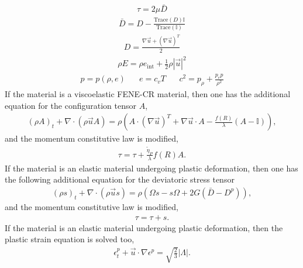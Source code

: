 \documentclass[]{article}
\newcommand{\EyeTen}{\mathbb{I}}
\begin{document}
\begin{eqnarray}
	\tau=2\mu\bar{D}
\end{eqnarray}
\begin{eqnarray}
	\bar{D}=D-\frac{\mbox{Trace}(D)\EyeTen}{\mbox{Trace}(\EyeTen)}
\end{eqnarray}
\begin{eqnarray}
	D=\frac{\nabla\vec{u}+(\nabla\vec{u})^{T}}{2}
\end{eqnarray}
\begin{eqnarray}
	\rho E=\rho e_{\mbox{int}}+
	\frac{1}{2}\rho|\vec{u}|^{2}
\end{eqnarray}
\begin{eqnarray}
p=p(\rho,e) \hspace{20pt} e=c_{v}T \hspace{20pt}
c^{2}=p_{\rho}+\frac{p_{e}p}{\rho^{2}}
\end{eqnarray}
If the material is a viscoelastic FENE-CR material, then one has the
additional equation for the configuration tensor 
$A$\cite{stewart2008improved},
\begin{eqnarray}
	(\rho A)_{t}+\nabla\cdot(\rho\vec{u} A)=
       \rho( A\cdot(\nabla\vec{u})^{T}+
	\nabla\vec{u}\cdot A-\frac{f(R)}{\lambda}(A-\EyeTen)) ,
\end{eqnarray}
and the momentum constitutive law is modified,
\begin{eqnarray}
	\tau=\tau+\frac{\tilde{\eta}_{P}}{\lambda}f(R)A.
\label{nonnewtonian}
\end{eqnarray}
If the material is an elastic material undergoing plastic deformation, then
one has the following additional equation for the deviatoric stress
tensor\cite{tran2004particle,UDAYKUMAR2003136,maire2013nominally}
\begin{eqnarray}
(\rho s)_{t}+\nabla\cdot(\rho\vec{u}s)= 
\rho(\Omega s-s\Omega+2G(\bar{D}-D^{p})), \label{plastic}
\end{eqnarray}
and the momentum constitutive law is modified,
\begin{eqnarray}
\tau=\tau+s.
\end{eqnarray}
If the material is an elastic material undergoing plastic deformation, then
the plastic strain equation is solved too,
\begin{eqnarray}
	\epsilon^{p}_{t}+\vec{u}\cdot\nabla\epsilon^{p}=
	\sqrt{\frac{2}{3}}|\Lambda|.
\end{eqnarray}
\end{document}
